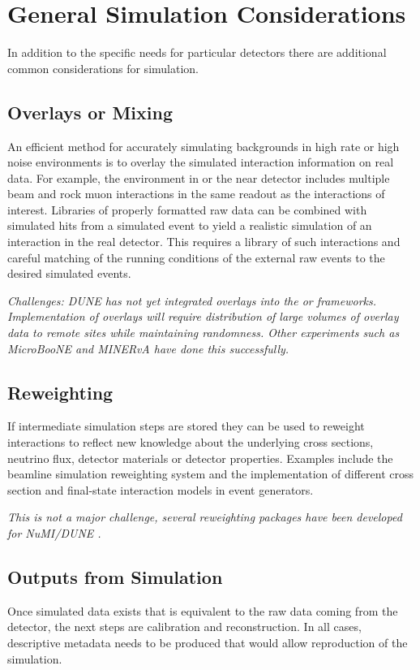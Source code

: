 \documentclass[../main-v1.tex]{subfiles}
\begin{document}
\section{General Simulation Considerations}

In addition to the specific needs for particular detectors there are additional common considerations for simulation. 

\subsection{Overlays or Mixing}
\label{sec:usecases_overlays}
An efficient method for accurately simulating backgrounds in high rate or high noise environments is to overlay the simulated interaction information on real data.  For example, the environment in  or the near detector includes multiple beam and rock muon interactions in the same readout as %
the interactions of interest.  Libraries of properly formatted raw data can be combined with simulated hits from a simulated event to yield a realistic simulation of an interaction in the real detector. This requires a library of such interactions and careful matching of the running conditions of the external raw events to the desired simulated events. 

{\it Challenges: %
DUNE has not yet integrated overlays into the  or   frameworks. %
Implementation of overlays will  require distribution of large volumes of overlay data to remote sites while maintaining randomness. Other experiments such as MicroBooNE and MINERvA have done this successfully. }

\subsection{Reweighting}
If intermediate simulation steps  are stored they can be used to reweight interactions to reflect new knowledge about the underlying cross sections, neutrino flux, detector materials or detector properties. Examples include the  beamline simulation reweighting system and the implementation of different cross section and final-state interaction models in event generators. 

{\it This is not a major challenge, several reweighting packages have been developed for NuMI/DUNE \cite{Aliaga:2015wva, Calcutt:2021zck}.}

\subsection{Outputs from Simulation}
Once simulated data exists
that is equivalent to the raw data coming from the detector, %
the next steps are calibration and reconstruction. In all cases, descriptive metadata needs to be produced that would allow reproduction of the simulation. 
\end{document}
